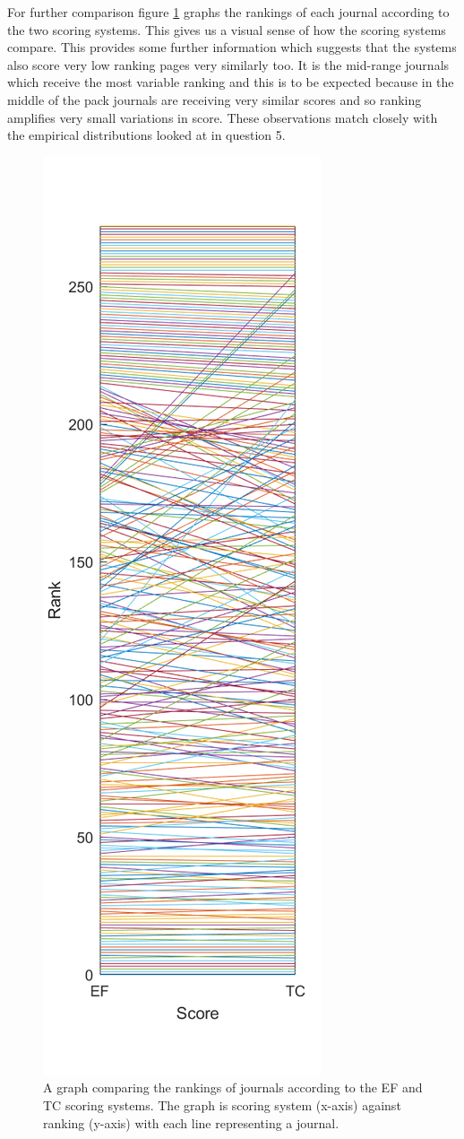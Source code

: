 \documentclass[a4paper]{article}
\begin{document}
For further comparison figure \ref{fig:q7graph} graphs the rankings of each journal according to the two scoring systems. This gives us a visual sense of how the scoring systems compare. This provides some further information which suggests that the systems also score very low ranking pages very similarly too. It is the mid-range journals which receive the most variable ranking and this is to be expected because in the middle of the pack journals are receiving very similar scores and so ranking amplifies very small variations in score. These observations match closely with the empirical distributions looked at in question 5.
\begin{figure}
    \centering
    \includegraphics[height=1.5\columnwidth]{q7.png}
    \caption{A graph comparing the rankings of journals according to the EF and TC scoring systems. The graph is scoring system (x-axis) against ranking (y-axis) with each line representing a journal.}
    \label{fig:q7graph}
\end{figure}
\end{document}
